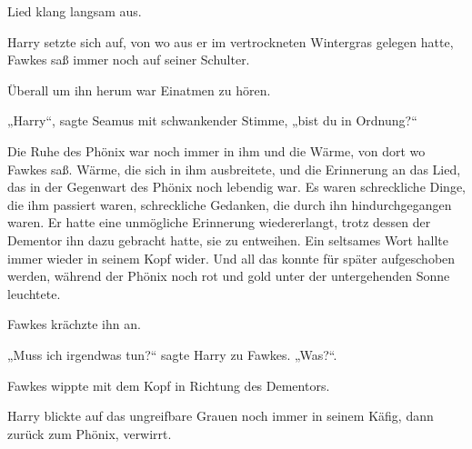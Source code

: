 
 Lied klang langsam aus.

\hplettrineextrapara
Harry setzte sich auf, von wo aus er im vertrockneten Wintergras gelegen hatte, Fawkes saß immer noch auf seiner Schulter.

Überall um ihn herum war Einatmen zu hören.

„Harry“, sagte Seamus mit schwankender Stimme, „bist du in Ordnung?“

Die Ruhe des Phönix war noch immer in ihm und die Wärme, von dort wo Fawkes saß. Wärme, die sich in ihm ausbreitete, und die Erinnerung an das Lied, das in der Gegenwart des Phönix noch lebendig war. Es waren schreckliche Dinge, die ihm passiert waren, schreckliche Gedanken, die durch ihn hindurchgegangen waren. Er hatte eine unmögliche Erinnerung wiedererlangt, trotz dessen der Dementor ihn dazu gebracht hatte, sie zu entweihen. Ein seltsames Wort hallte immer wieder in seinem Kopf wider. Und all das konnte für später aufgeschoben werden, während der Phönix noch rot und gold unter der untergehenden Sonne leuchtete.

Fawkes krächzte ihn an.

„Muss ich irgendwas tun?“ sagte Harry zu Fawkes.
„Was?“.

Fawkes wippte mit dem Kopf in Richtung des Dementors.

Harry blickte auf das ungreifbare Grauen noch immer in seinem Käfig, dann zurück zum Phönix, verwirrt.

